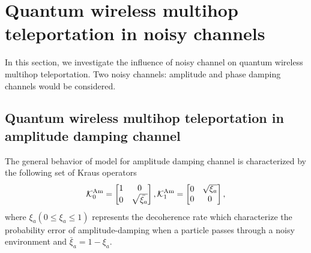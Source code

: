 \documentclass[aps,pra,twocolumn,showpacs,superscriptaddress,groupedaddress]{revtex4}
\begin{document}
\section{Quantum wireless multihop teleportation in noisy channels}
In this section, we investigate the inﬂuence of noisy channel on quantum wireless multihop teleportation. Two noisy channels: amplitude and phase damping channels would be considered.

\subsection{Quantum wireless multihop teleportation in amplitude damping channel}
The general behavior of model for amplitude damping channel is characterized by the following set of Kraus operators \cite{MA10}
\begin{equation}
\mathcal{K}_0^{\rm Am}=\left[\begin{matrix}1&0\\0&\sqrt{\bar{\xi_{a}}}\end{matrix}\right], \mathcal{K}_1^{\rm Am}=\left[\begin{matrix}0&\sqrt{\xi_{a}}\\0&0\end{matrix}\right],
\label{SUS3}
\end{equation}
where $\xi_{a}(0\leq\xi_{a}\leq 1)$ represents the decoherence rate which characterize the probability error of amplitude-damping when a particle passes through a noisy environment and $\bar{\xi}_{a}=1-\xi_{a}$. 
\end{document}
